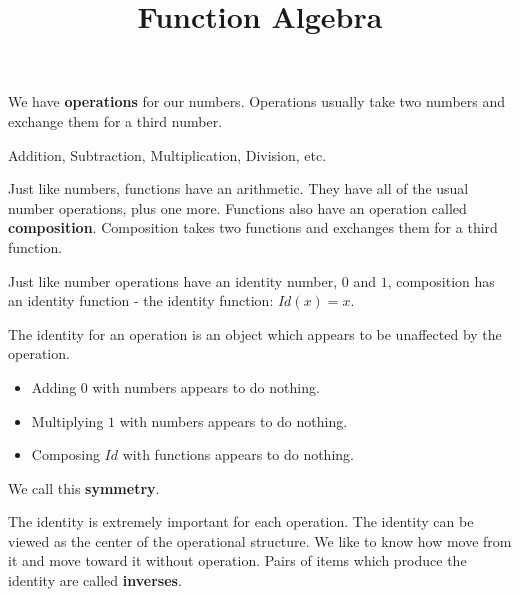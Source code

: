 \documentclass{ximera}
\title{Function Algebra}
\begin{document}
\begin{abstract}

\end{abstract}
\maketitle
















We have \textbf{operations} for our numbers.  Operations usually take two numbers and exchange them for a third number.

\begin{center}
Addition, Subtraction, Multiplication, Division, etc.
\end{center}



Just like numbers, functions have an arithmetic.  They have all of the usual number operations, plus one more.  Functions also have an operation called \textbf{\textcolor{purple!85!blue}{composition}}.  Composition takes two functions and exchanges them for a third function.

Just like number operations have an identity number, $0$ and $1$, composition has an identity function - the identity function: $Id(x) = x$.


The identity for an operation is an object which appears to be unaffected by the operation.  


\begin{itemize}
\item Adding $0$ with numbers appears to do nothing.
\item Multiplying $1$ with numbers appears to do nothing.
\item Composing $Id$ with functions appears to do nothing.
\end{itemize}




We call this \textbf{symmetry}.



The identity is extremely important for each operation.  The identity can be viewed as the center of the operational structure.  We like to know how move from it and move toward it without operation.  Pairs of items which produce the identity are called \textbf{\textcolor{purple!85!blue}{inverses}}.
\end{document}
